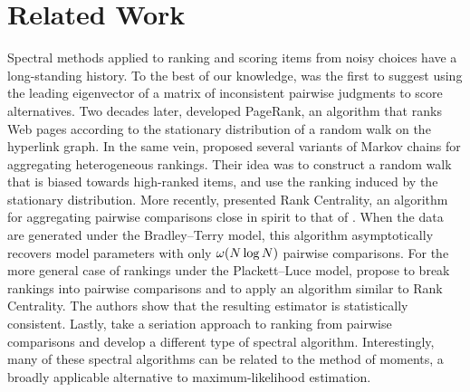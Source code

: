\section{Related Work}
\label{fi:sec:relwork}

Spectral methods applied to ranking and scoring items from noisy choices have a long-standing history.
To the best of our knowledge, \citet{saaty1980analytic} was the first to suggest using the leading eigenvector of a matrix of inconsistent pairwise judgments to score alternatives.
Two decades later, \citet{page1998pagerank} developed PageRank, an algorithm that ranks Web pages according to the stationary distribution of a random walk on the hyperlink graph.
In the same vein, \citet{dwork2001rank} proposed several variants of Markov chains for aggregating heterogeneous rankings.
Their idea was to construct a random walk that is biased towards high-ranked items, and use the ranking induced by the stationary distribution.
More recently, \citet{negahban2012iterative} presented Rank Centrality, an algorithm for aggregating pairwise comparisons close in spirit to that of \citet{dwork2001rank}.
When the data are generated under the Bradley--Terry model, this algorithm asymptotically recovers model parameters with only $\omega(N \log N)$ pairwise comparisons.
For the more general case of rankings under the Plackett--Luce model, \citet{azari2013generalized} propose to break rankings into pairwise comparisons and to apply an algorithm similar to Rank Centrality.
The authors show that the resulting estimator is statistically consistent.
Lastly, \citet{fogel2014serialrank} take a seriation approach to ranking from pairwise comparisons and develop a different type of spectral algorithm.
Interestingly, many of these spectral algorithms can be related to the method of moments, a broadly applicable alternative to maximum-likelihood estimation.


